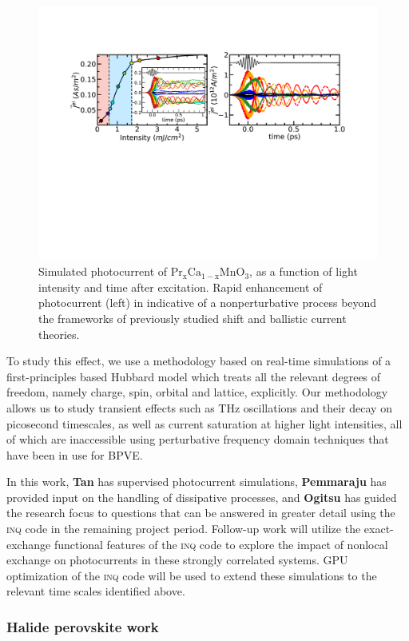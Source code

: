 \begin{figure}[ht]
	\centering\includegraphics[width=0.8\linewidth]{figures/photocurrent_old}
	\caption{
		Simulated photocurrent of \(\mathrm{Pr_xCa_{1-x}MnO_3}\), as a function of light intensity and time after excitation. 
		Rapid enhancement of photocurrent (left) in indicative of a nonperturbative process beyond the frameworks of previously studied shift and ballistic current theories.
	}
	\label{fig:PCMO}
\end{figure}

To study this effect, we use a methodology based on real-time simulations of a first-principles based Hubbard model which treats all the relevant degrees of freedom, namely charge, spin, orbital and lattice, explicitly. 
Our methodology allows us to study transient effects such as THz oscillations and their decay on picosecond timescales, as well as current saturation at higher light intensities, all of which are inaccessible using perturbative frequency domain techniques that have been in use for BPVE. 

In this work, {\bf Tan} has supervised photocurrent simulations, {\bf Pemmaraju} has provided input on the handling of dissipative processes, and {\bf Ogitsu} has guided the research focus to questions that can be answered in greater detail using the \textsc{inq} code in the remaining project period. 
Follow-up work will utilize the exact-exchange functional features of the \textsc{inq} code to explore the impact of nonlocal exchange on photocurrents in these strongly correlated systems. 
GPU optimization of the \textsc{inq} code will be used to extend these simulations to the relevant time scales identified above.  

\subsubsection{Halide perovskite work}

